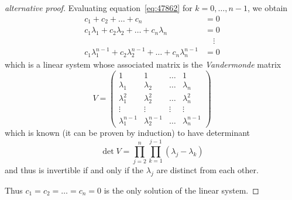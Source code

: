 \begin{proof}[alternative proof]
Evaluating equation~\eqref{eq:47862} for $k=0,\dots, n-1$, we obtain
\begin{align*}
  c_1 + c_2 + \dots + c_n & = 0 \\
  c_1 \lambda_1 + c_2 \lambda_2 + \dots + c_n \lambda_n & = 0 \\
  &\quad \vdots\\
  c_1 \lambda_1^{n-1} + c_2 \lambda_2^{n-1} + \dots + c_n \lambda_n^{n-1} & = 0
\end{align*}
which is a linear system whose associated matrix is
the \emph{Vandermonde} matrix%
%
\[
V =
\begin{pmatrix}
  1 & 1 &  \dots & 1 \\
  \lambda_1 & \lambda_2 & \dots & \lambda_n \\
  \lambda_1^2 & \lambda_2^2 & \dots & \lambda_n^2 \\
  \vdots & \vdots & \vdots & \vdots \\
  \lambda_1^{n-1} & \lambda_2^{n-1} & \dots & \lambda_n^{n-1}
\end{pmatrix}
\]
which is known (it can be proven by induction) to have determinant
\[
  \det V = \prod_{j=2}^{n} \prod_{k=1}^{j-1}(\lambda_j-\lambda_k)
\]
and thus
is invertible if and only if
the $\lambda_j$ are distinct from each other.

Thus $c_1 = c_2 = \dots = c_n = 0$ is the only solution
of the linear system.
\end{proof}

